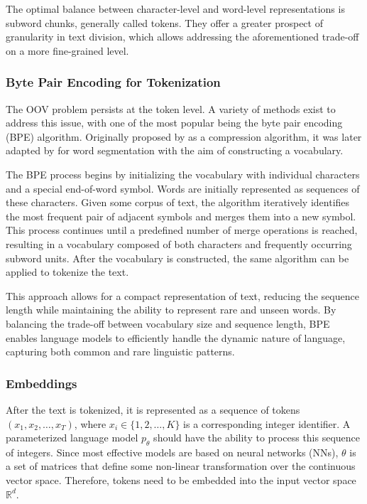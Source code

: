 The optimal balance between character-level and word-level representations is subword chunks, generally called tokens. They offer a greater prospect of granularity in text division, which allows addressing the aforementioned trade-off on a more fine-grained level.

\subsubsection*{Byte Pair Encoding for Tokenization}

The OOV problem persists at the token level. A variety of methods exist to address this issue, with one of the most popular being the byte pair encoding (BPE) algorithm. Originally proposed by \citet{gage1994} as a compression algorithm, it was later adapted by \citet{sennrich2016} for word segmentation with the aim of constructing a vocabulary.

The BPE process begins by initializing the vocabulary with individual characters and a special end-of-word symbol. Words are initially represented as sequences of these characters. Given some corpus of text, the algorithm iteratively identifies the most frequent pair of adjacent symbols and merges them into a new symbol. This process continues until a predefined number of merge operations is reached, resulting in a vocabulary composed of both characters and frequently occurring subword units. After the vocabulary is constructed, the same algorithm can be applied to tokenize the text.

This approach allows for a compact representation of text, reducing the sequence length while maintaining the ability to represent rare and unseen words. By balancing the trade-off between vocabulary size and sequence length, BPE enables language models to efficiently handle the dynamic nature of language, capturing both common and rare linguistic patterns.

\subsubsection*{Embeddings}\label{sec:embeddings}

\begin{sloppypar}
After the text is tokenized, it is represented as a sequence of tokens \((x_1, x_2, \ldots, x_T)\), where \(x_i \in \{1, 2, \ldots, K\}\) is a corresponding integer identifier. A parameterized language model \(p_\theta\) should have the ability to process this sequence of integers. Since most effective models are based on neural networks (NNs), \(\theta\) is a set of matrices that define some non-linear transformation over the continuous vector space. Therefore, tokens need to be embedded into the input vector space \(\mathbb{R}^d\).
\end{sloppypar}

